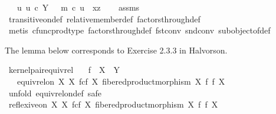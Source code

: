 \begin{isabellebody}
\ \ \ {\isachardoublequoteopen}{\isasymexists}u{\isachardot}{\kern0pt}\ u\ {\isasymin}\isactrlsub c\ Y\ {\isasymand}\ \ m\ {\isasymcirc}\isactrlsub c\ u\ {\isacharequal}{\kern0pt}\ {\isasymlangle}x{\isacharcomma}{\kern0pt}z{\isasymrangle}{\isachardoublequoteclose}\isanewline
%
\isadelimproof
\ \ %
\endisadelimproof
%
\isatagproof
{}\isamarkupfalse%
\ assms\ \isamarkupfalse%
\ transitive{\isacharunderscore}{\kern0pt}on{\isacharunderscore}{\kern0pt}def\ relative{\isacharunderscore}{\kern0pt}member{\isacharunderscore}{\kern0pt}def\ factors{\isacharunderscore}{\kern0pt}through{\isacharunderscore}{\kern0pt}def{}\isanewline
\ \ \isamarkupfalse%
\ {\isacharparenleft}{\kern0pt}metis\ cfunc{\isacharunderscore}{\kern0pt}prod{\isacharunderscore}{\kern0pt}type\ factors{\isacharunderscore}{\kern0pt}through{\isacharunderscore}{\kern0pt}def{}\ fst{\isacharunderscore}{\kern0pt}conv\ snd{\isacharunderscore}{\kern0pt}conv\ subobject{\isacharunderscore}{\kern0pt}of{\isacharunderscore}{\kern0pt}def{}{\isacharparenright}{\kern0pt}%
\endisatagproof
{\isafoldproof}%
%
\isadelimproof
%
\endisadelimproof
%
\begin{isamarkuptext}%
The lemma below corresponds to Exercise 2.3.3 in Halvorson.%
\end{isamarkuptext}\isamarkuptrue%
\isamarkupfalse%
\ kernel{\isacharunderscore}{\kern0pt}pair{\isacharunderscore}{\kern0pt}equiv{\isacharunderscore}{\kern0pt}rel{\isacharcolon}{\kern0pt}\isanewline
\ \ \ {\isachardoublequoteopen}f\ {\isacharcolon}{\kern0pt}\ X\ {\isasymrightarrow}\ Y{\isachardoublequoteclose}\isanewline
\ \ \ {\isachardoublequoteopen}equiv{\isacharunderscore}{\kern0pt}rel{\isacharunderscore}{\kern0pt}on\ X\ {\isacharparenleft}{\kern0pt}X\ \isactrlbsub f\isactrlesub {\isasymtimes}\isactrlsub c\isactrlbsub f\isactrlesub \ X{\isacharcomma}{\kern0pt}\ fibered{\isacharunderscore}{\kern0pt}product{\isacharunderscore}{\kern0pt}morphism\ X\ f\ f\ X{\isacharparenright}{\kern0pt}{\isachardoublequoteclose}\isanewline
%
\isadelimproof
%
\endisadelimproof
%
\isatagproof
{}\isamarkupfalse%
\ {\isacharparenleft}{\kern0pt}unfold\ equiv{\isacharunderscore}{\kern0pt}rel{\isacharunderscore}{\kern0pt}on{\isacharunderscore}{\kern0pt}def{\isacharcomma}{\kern0pt}\ safe{\isacharparenright}{\kern0pt}\isanewline
\ \ \isamarkupfalse%
\ {\isachardoublequoteopen}reflexive{\isacharunderscore}{\kern0pt}on\ X\ {\isacharparenleft}{\kern0pt}X\ \isactrlbsub f\isactrlesub {\isasymtimes}\isactrlsub c\isactrlbsub f\isactrlesub \ X{\isacharcomma}{\kern0pt}\ fibered{\isacharunderscore}{\kern0pt}product{\isacharunderscore}{\kern0pt}morphism\ X\ f\ f\ X{\isacharparenright}{\kern0pt}{\isachardoublequoteclose}\isanewline

\end{isabellebody}
